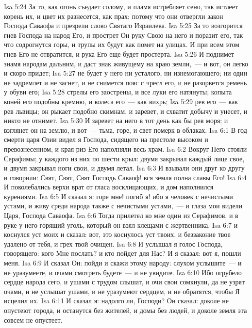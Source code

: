 \vs Isa 5:24 За то, как огонь съедает солому, и пламя истребляет сено, так истлеет корень их, и цвет их разнесется, как прах; потому что они отвергли закон Господа Саваофа и презрели слово Святаго Израилева.
\vs Isa 5:25 За то возгорится гнев Господа на народ Его, и прострет Он руку Свою на него и поразит его, так что содрогнутся горы, и трупы их будут как помет на улицах. И при всем этом гнев Его не отвратится, и рука Его еще будет простерта.
\vs Isa 5:26 И поднимет знамя народам дальним, и даст знак живущему на краю земли,~--- и вот, он легко и скоро придет;
\vs Isa 5:27 не будет у него ни усталого, ни изнемогающего; ни один не задремлет и не заснет, и не снимется пояс с чресл его, и не разорвется ремень у обуви его;
\vs Isa 5:28 стрелы его заострены, и все луки его натянуты; копыта коней его подобны кремню, и колеса его~--- как вихрь;
\vs Isa 5:29 рев его~--- как рев львицы; он рыкает подобно скимнам, и заревет, и схватит добычу и унесет, и никто не отнимет.
\vs Isa 5:30 И заревет на него в тот день как бы рев  моря; и взглянет он на землю, и вот~--- тьма, горе, и свет померк в облаках.
\vs Isa 6:1 В год смерти царя Озии видел я Господа, сидящего на престоле высоком и превознесенном, и края риз Его наполняли весь храм.
\vs Isa 6:2 Вокруг Него стояли Серафимы; у каждого из них по шести крыл: двумя закрывал каждый лице свое, и двумя закрывал ноги свои, и двумя летал.
\vs Isa 6:3 И взывали они друг ко другу и говорили: Свят, Свят, Свят Господь Саваоф! вся земля полна славы Его!
\vs Isa 6:4 И поколебались верхи врат от гласа восклицающих, и дом наполнился курениями.
\vs Isa 6:5 И сказал я: горе мне! погиб я! ибо я человек с нечистыми устами, и живу среди народа также с нечистыми устами,~--- и глаза мои видели Царя, Господа Саваофа.
\vs Isa 6:6 Тогда прилетел ко мне один из Серафимов, и в руке у него горящий уголь, который он взял клещами с жертвенника,
\vs Isa 6:7 и коснулся уст моих и сказал: вот, это коснулось уст твоих, и беззаконие твое удалено от тебя, и грех твой очищен.
\rsbpar\vs Isa 6:8 И услышал я голос Господа, говорящего: кого Мне послать? и кто пойдет для Нас? И я сказал: вот я, пошли меня.
\vs Isa 6:9 И сказал Он: пойди и скажи этому народу: слухом услышите~--- и не уразумеете, и очами смотреть будете~--- и не увидите.
\vs Isa 6:10 Ибо огрубело сердце народа сего, и ушами с трудом слышат, и очи свои сомкнули, да не узрят очами, и не услышат ушами, и не уразумеют сердцем, и не обратятся, чтобы Я исцелил их.
\vs Isa 6:11 И сказал я: надолго ли, Господи? Он сказал: доколе не опустеют города, и останутся без жителей, и домы без людей, и доколе земля эта совсем не опустеет.

